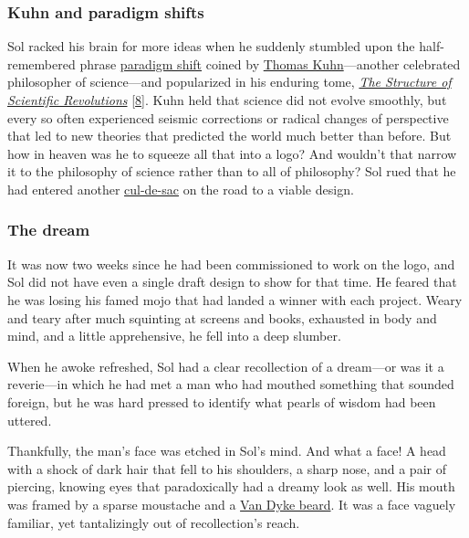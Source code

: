\documentclass[
  a4paper,
]{article}
\begin{document}
\hypertarget{kuhn-and-paradigm-shifts}{%
\subsubsection{Kuhn and paradigm
shifts}\label{kuhn-and-paradigm-shifts}}

Sol racked his brain for more ideas when he suddenly stumbled upon the
half-remembered phrase
\href{https://www.lexico.com/definition/paradigm_shift}{paradigm shift}
coined by \href{https://en.wikipedia.org/wiki/Thomas_Kuhn}{Thomas
Kuhn}---another celebrated philosopher of science---and popularized in
his enduring tome,
\href{https://www.amazon.com/Structure-Scientific-Revolutions-50th-Anniversary/dp/0226458121/}{\emph{The
Structure of Scientific Revolutions}}
{[}\protect\hyperlink{ref-kuhn2012}{8}{]}. Kuhn held that science did
not evolve smoothly, but every so often experienced seismic corrections
or radical changes of perspective that led to new theories that
predicted the world much better than before. But how in heaven was he to
squeeze all that into a logo? And wouldn't that narrow it to the
philosophy of science rather than to all of philosophy? Sol rued that he
had entered another
\href{https://www.merriam-webster.com/dictionary/cul-de-sac}{cul-de-sac}
on the road to a viable design.

\hypertarget{the-dream}{%
\subsubsection{The dream}\label{the-dream}}

It was now two weeks since he had been commissioned to work on the logo,
and Sol did not have even a single draft design to show for that time.
He feared that he was losing his famed mojo that had landed a winner
with each project. Weary and teary after much squinting at screens and
books, exhausted in body and mind, and a little apprehensive, he fell
into a deep slumber.

When he awoke refreshed, Sol had a clear recollection of a dream---or
was it a reverie---in which he had met a man who had mouthed something
that sounded foreign, but he was hard pressed to identify what pearls of
wisdom had been uttered.

Thankfully, the man's face was etched in Sol's mind. And what a face! A
head with a shock of dark hair that fell to his shoulders, a sharp nose,
and a pair of piercing, knowing eyes that paradoxically had a dreamy
look as well. His mouth was framed by a sparse moustache and a
\href{https://en.wikipedia.org/wiki/Van_Dyke_beard}{Van Dyke beard}. It
was a face vaguely familiar, yet tantalizingly out of recollection's
reach.
\end{document}
